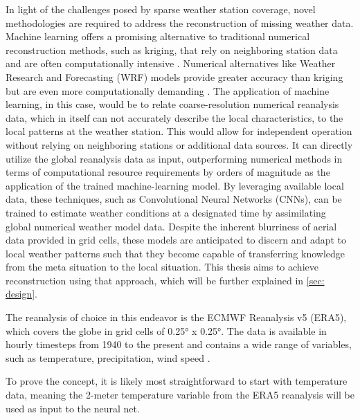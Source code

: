 
In light of the challenges posed by sparse weather station coverage, novel methodologies are required to address the reconstruction of missing weather data.
Machine learning offers a promising alternative to traditional numerical reconstruction methods, such as kriging, that rely on neighboring station data and are often computationally intensive \cite{chung2019kriging}. Numerical alternatives like Weather Research and Forecasting (WRF) models provide greater accuracy than kriging but are even more computationally demanding \cite{skamarock2008wrf}.
The application of machine learning, in this case, would be to relate coarse-resolution numerical reanalysis data, which in itself can not accurately describe the local characteristics, to the local patterns at the weather station.
This would allow for independent operation without relying on neighboring stations or additional data sources. It can directly utilize the global reanalysis data as input, outperforming numerical methods in terms of computational resource requirements by orders of magnitude \cite{kurth2023MLperformance,bi2023MLperformance,lam2023MLperformance} as the application of the trained machine-learning model.
By leveraging available local data, these techniques, such as Convolutional Neural Networks (CNNs), can be trained to estimate weather conditions at a designated time by assimilating global numerical weather model data.
Despite the inherent blurriness of aerial data provided in grid cells, these models are anticipated to discern and adapt to local weather patterns such that they become capable of transferring knowledge from the meta situation to the local situation.
This thesis aims to achieve reconstruction using that approach, which will be further explained in \autoref{sec: design}.


The reanalysis of choice in this endeavor is the ECMWF Reanalysis v5 (ERA5), which covers the globe in grid cells of 0.25° x 0.25°.
The data is available in hourly timesteps from 1940 to the present and contains a wide range of variables, such as temperature, precipitation, wind speed \cite{era5}.

To prove the concept, it is likely most straightforward to start with temperature data, meaning the 2-meter temperature variable from the ERA5 reanalysis will be used as input to the neural net.

